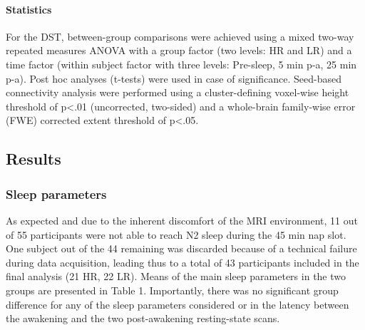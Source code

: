 \paragraph{Statistics}
For the DST, between-group comparisons were achieved using a mixed two-way repeated measures ANOVA with a group factor (two levels: HR and LR) and a time factor (within subject factor with three levels: Pre-sleep, 5 min p-a, 25 min p-a). Post hoc analyses (t-tests) were used in case of significance. Seed-based connectivity analysis were performed using a cluster-defining voxel-wise height threshold of p<.01 (uncorrected, two-sided) and a whole-brain family-wise error (FWE) corrected extent threshold of p<.05.

\subsection*{Results}
\label{res:inertia:drf:results}

\subsubsection*{Sleep parameters}
As expected and due to the inherent discomfort of the MRI environment, 11 out of 55 participants were not able to reach N2 sleep during the 45 min nap slot. One subject out of the 44 remaining was discarded because of a technical failure during data acquisition, leading thus to a total of 43 participants included in the final analysis (21 HR, 22 LR). Means of the main sleep parameters in the two groups are presented in Table 1. Importantly, there was no significant group difference for any of the sleep parameters considered or in the latency between the awakening and the two post-awakening resting-state scans.

